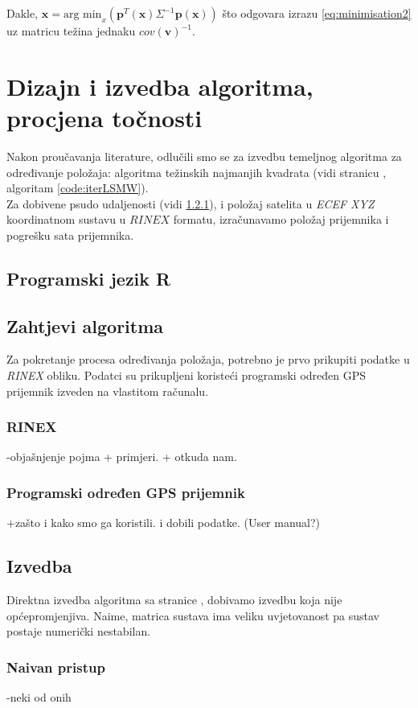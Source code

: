 \documentclass[a4paper,twoside,12pt]{memoir} %
\begin{document}
Dakle, $\hat{\mathbf{x}} = \text{arg min}_x \left( \mathbf{p}^T (\mathbf{x}) \Sigma^{-1}\mathbf{p} (\mathbf{x}) \right)$ 
što odgovara izrazu \ref{eq:minimisation2} uz matricu težina jednaku $cov(\mathbf{v})^{-1}$.

\chapter{Dizajn i izvedba algoritma, procjena točnosti}\label{sec:izvedba}
Nakon proučavanja literature, odlučili smo se za izvedbu temeljnog algoritma 
za određivanje položaja: algoritma težinskih najmanjih kvadrata (vidi stranicu \pageref{code:iterLSMW}, algoritam \ref{code:iterLSMW}).
\\Za dobivene psudo udaljenosti (vidi \ref{sssec:rinex}), i 
položaj satelita u \textit{ECEF XYZ} koordinatnom sustavu u $RINEX$ formatu, izračunavamo položaj
prijemnika i pogrešku sata prijemnika.
\section{Programski jezik R}
\section{Zahtjevi algoritma}
Za pokretanje procesa određivanja položaja, potrebno je prvo prikupiti podatke u \textit{RINEX} obliku. Podatci su prikupljeni koristeći programski određen GPS prijemnik izveden na vlastitom računalu.
\subsection{RINEX}\label{sssec:rinex}
-objašnjenje pojma + primjeri. + otkuda nam.
\subsection{Programski određen GPS prijemnik}
+zašto i kako smo ga koristili. i dobili podatke. (User manual?)

\section{Izvedba}
Direktna izvedba algoritma sa stranice \pageref{code:iterLSMW}, dobivamo 
izvedbu koja nije općepromjenjiva.
Naime, matrica sustava ima veliku uvjetovanost pa sustav postaje numerički nestabilan.
\subsection{Naivan pristup}
-neki od onih
\end{document}
